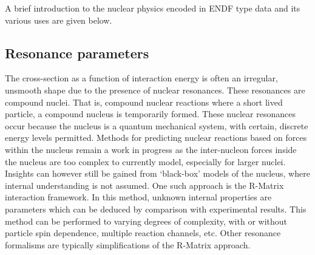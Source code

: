 
A brief introduction to the nuclear physics encoded in ENDF type data and its various uses are given below.

\subsection{Resonance parameters}
The cross-section as a function of interaction energy is often an irregular, unsmooth shape due to the presence of nuclear resonances. These resonances are compound nuclei. That is, compound nuclear reactions where a short lived particle, a compound nucleus is temporarily formed. These nuclear resonances occur because the nucleus is a quantum mechanical system, with certain, discrete energy levels permitted. Methods for predicting nuclear reactions based on forces within the nucleus remain a work in progress as the inter-nucleon forces inside the nucleus are too complex to currently model, especially for larger nuclei. Insights can however still be gained from `black-box' models of the nucleus, where internal understanding is not assumed. One such approach is the R-Matrix interaction framework. In this method, unknown internal properties are parameters which can be deduced by comparison with experimental results. This method can be performed to varying degrees of complexity, with or without particle spin dependence, multiple reaction channels, etc. Other resonance formalisms are typically simplifications of the R-Matrix approach.

